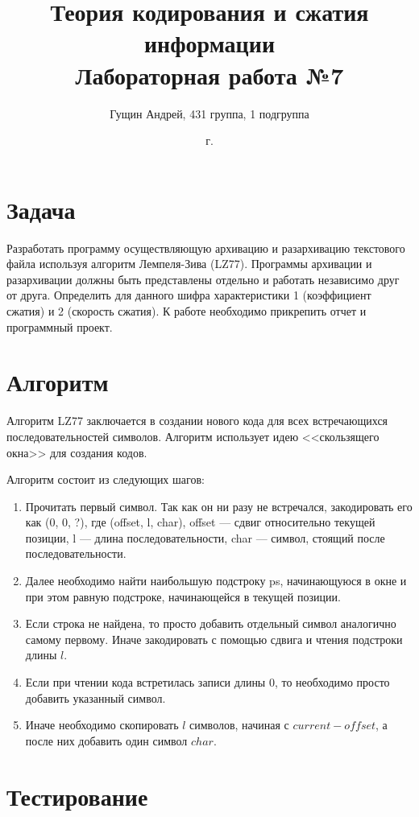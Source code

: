 \documentclass[a4paper,oneside]{article}
\title{{Теория кодирования и сжатия информации}\\{Лабораторная работа №7}}
\author{Гущин Андрей, 431 группа, 1 подгруппа}
\date{\the\year{} г.}
\theoremstyle{definition}
\begin{document}
\maketitle

\section{Задача}

Разработать программу осуществляющую архивацию и разархивацию текстового файла
используя алгоритм Лемпеля-Зива (LZ77). Программы архивации и разархивации
должны быть представлены отдельно и работать независимо друг от друга.
Определить для данного шифра характеристики 1 (коэффициент сжатия) и 2 (скорость
сжатия). К работе необходимо прикрепить отчет и программный проект.


\section{Алгоритм}

Алгоритм LZ77 заключается в создании нового кода для всех встречающихся
последовательностей символов. Алгоритм использует идею <<скользящего окна>>
для создания кодов.

Алгоритм состоит из следующих шагов:
\begin{enumerate}
  \item
    Прочитать первый символ. Так как он ни разу не встречался, закодировать его
    как (0, 0, ?), где (offset, l, char), offset --- сдвиг относительно текущей
    позиции, l --- длина последовательности, char --- символ, стоящий после
    последовательности.
  \item
    Далее необходимо найти наибольшую подстроку ps, начинающуюся в окне и
    при этом равную подстроке, начинающейся в текущей позиции.
  \item
    Если строка не найдена, то просто добавить отдельный символ аналогично
    самому первому. Иначе закодировать с помощью сдвига и чтения подстроки
    длины $l$.
  \item
    Если при чтении кода встретилась записи длины 0, то необходимо просто
    добавить указанный символ.
  \item
    Иначе необходимо скопировать $l$ символов, начиная с $current - offset$, а
    после них добавить один символ $char$.
\end{enumerate}


\section{Тестирование}
\end{document}
